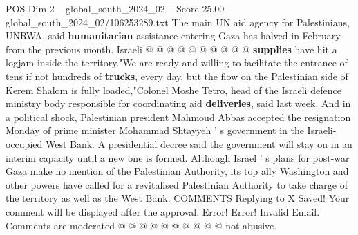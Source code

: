 \begin{textsample}{POS Dim 2 – global\_south\_2024\_02 – Score 25.00 – global\_south\_2024\_02/106253289.txt}
The main UN aid agency for Palestinians, UNRWA, said \textbf{humanitarian} assistance entering Gaza has halved in February from the previous month.
Israeli @ @ @ @ @ @ @ @ @ @ \textbf{supplies} have hit a logjam inside the territory."We are ready and willing to facilitate the entrance of tens if not hundreds of \textbf{trucks}, every day, but the flow on the Palestinian side of Kerem Shalom is fully loaded,"Colonel Moshe Tetro, head of the Israeli defence ministry body responsible for coordinating aid \textbf{deliveries}, said last week.
And in a political shock, Palestinian president Mahmoud Abbas accepted the resignation Monday of prime minister Mohammad Shtayyeh ' s government in the Israeli-occupied West Bank.
A presidential decree said the government will stay on in an interim capacity until a new one is formed.
Although Israel ' s plans for post-war Gaza make no mention of the Palestinian Authority, its top ally Washington and other powers have called for a revitalised Palestinian Authority to take charge of the territory as well as the West Bank.
COMMENTS Replying to X Saved!
Your comment will be displayed after the approval.
Error!
Error!
Invalid Email.
Comments are moderated @ @ @ @ @ @ @ @ @ @ not abusive.

\end{textsample}
